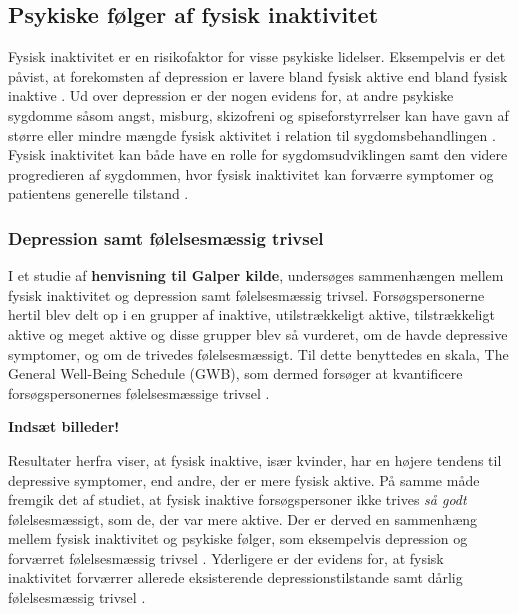 \subsection{Psykiske følger af fysisk inaktivitet}
Fysisk inaktivitet er en risikofaktor for visse psykiske lidelser. Eksempelvis er det påvist, at forekomsten af depression er lavere bland fysisk aktive end bland fysisk inaktive \citep{motionsraad2007}. Ud over depression er der nogen evidens for, at andre psykiske sygdomme såsom angst, misburg, skizofreni og spiseforstyrrelser kan have gavn af større eller mindre mængde fysisk aktivitet i relation til sygdomsbehandlingen \citep{kessing2016}. Fysisk inaktivitet kan både have en rolle for sygdomsudviklingen samt den videre progredieren af sygdommen, hvor fysisk inaktivitet kan forværre symptomer og patientens generelle tilstand \citep{motionsraad2007,kessing2016}.

\subsubsection{Depression samt følelsesmæssig trivsel}
I et studie af \textbf{henvisning til Galper kilde}, undersøges sammenhængen mellem fysisk inaktivitet og depression samt følelsesmæssig trivsel. Forsøgspersonerne hertil blev delt op i en grupper af inaktive, utilstrækkeligt aktive, tilstrækkeligt aktive og meget aktive og disse grupper blev så vurderet, om de havde depressive symptomer, og om de trivedes følelsesmæssigt. 
Til dette benyttedes en skala, The General Well-Being Schedule (GWB), som dermed forsøger at kvantificere forsøgspersonernes følelsesmæssige trivsel \citep{galper2006}.

\textbf{Indsæt billeder!} 

Resultater herfra viser, at fysisk inaktive, især kvinder, har en højere tendens til depressive symptomer, end andre, der er mere fysisk aktive. På samme måde fremgik det af studiet, at fysisk inaktive forsøgspersoner  ikke trives \textit{så godt} følelsesmæssigt, som de, der var mere aktive. Der er derved en sammenhæng mellem fysisk inaktivitet og psykiske følger, som eksempelvis depression og forværret følelsesmæssig trivsel \citep{galper2006}. Yderligere er der evidens for, at fysisk inaktivitet forværrer allerede eksisterende depressionstilstande samt dårlig følelsesmæssig trivsel \citep{motionsraad2007}.
